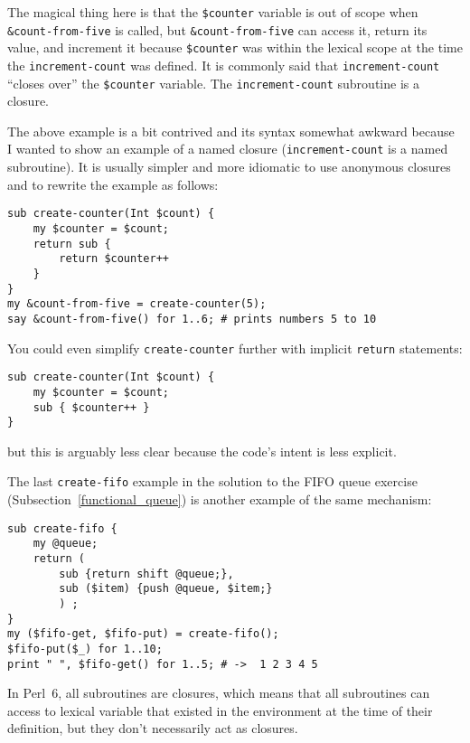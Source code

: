 The magical thing here is that the \verb'$counter' variable 
is out of scope when \verb'&count-from-five' is called, 
but \verb'&count-from-five' can access it, return its value, 
and increment it because \verb'$counter' was within the 
lexical scope at the time the {\tt increment-count} was 
defined. It is commonly said that {\tt increment-count} 
``closes over'' the \verb'$counter' variable. 
The {\tt increment-count} subroutine is a closure.

The above example is a bit contrived and its syntax 
somewhat awkward because I wanted to show an example 
of a named closure ({\tt increment-count} is a named 
subroutine). It is usually simpler and more idiomatic 
to use anonymous closures and to rewrite the example 
as follows:

\begin{verbatim}
sub create-counter(Int $count) {
    my $counter = $count;
    return sub {
        return $counter++
    }
}
my &count-from-five = create-counter(5);
say &count-from-five() for 1..6; # prints numbers 5 to 10
\end{verbatim}

You could even simplify {\tt create-counter} further 
with implicit {\tt return} statements:

\begin{verbatim}
sub create-counter(Int $count) {
    my $counter = $count;
    sub { $counter++ }
}
\end{verbatim}

but this is arguably less clear because the code's intent 
is less explicit.

The last {\tt create-fifo} example in the solution to 
the FIFO queue exercise (Subsection~\ref{functional_queue}) 
is another example of the same mechanism:

\begin{verbatim}
sub create-fifo {
    my @queue;
    return (
        sub {return shift @queue;}, 
        sub ($item) {push @queue, $item;}
        ) ;
}
my ($fifo-get, $fifo-put) = create-fifo();
$fifo-put($_) for 1..10;
print " ", $fifo-get() for 1..5; # ->  1 2 3 4 5
\end{verbatim}
%

In Perl~6, all subroutines are closures, which means that 
all subroutines can access to lexical variable that 
existed in the environment at the time of their definition, 
but they don't necessarily act as closures.

